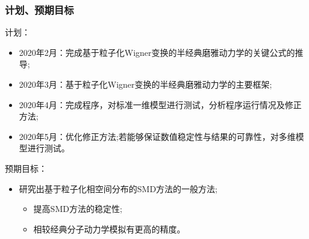 \documentclass{beamer}
\begin{document}
\begin{frame}[t]\frametitle{计划、预期目标}
计划：
\begin{itemize}
	\item 2020年2月：完成基于粒子化Wigner变换的半经典磨雅动力学的关键公式的推导;
	\item 2020年3月：基于粒子化Wigner变换的半经典磨雅动力学的主要框架;
	\item 2020年4月：完成程序，对标准一维模型进行测试，分析程序运行情况及修正方法;
	\item 2020年5月：优化修正方法;若能够保证数值稳定性与结果的可靠性，对多维模型进行测试。
\end{itemize}
预期目标：
\begin{itemize}
\item 研究出基于粒子化相空间分布的SMD方法的一般方法;
\begin{itemize}
\item 提高SMD方法的稳定性;
\item 相较经典分子动力学模拟有更高的精度。
\end{itemize}
\end{itemize}
\end{frame}
\end{document}
